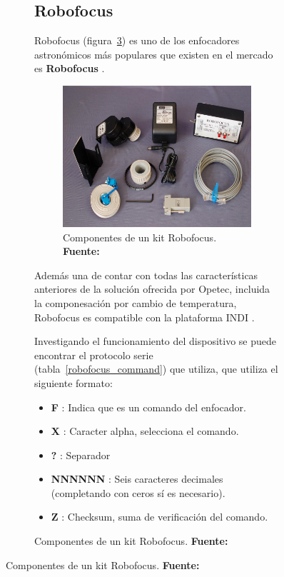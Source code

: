 \begin{itemize}
\begin{itemize}
\begin{figure}[h]
\begin{figure}[h]
\subsection{Robofocus}
\label{sec:robofocus}

Robofocus (figura~\ref{fig:robofocus2}) es uno de los enfocadores astronómicos más populares que existen en el mercado es \textbf{Robofocus} \cite{robofocus}.

\begin{figure}
\centering
\includegraphics[width=1\linewidth]{../images/robofocus2}
\caption[Kit Robofocus]{Componentes de un kit Robofocus. \textbf{Fuente:} \cite{robofocus}}
\label{fig:robofocus2}
\end{figure}

Además una de contar con todas las características anteriores de la solución ofrecida por Opetec, incluida la componesación por cambio de temperatura, Robofocus es compatible con la plataforma INDI \cite{robofocus_indi}. 

Investigando el funcionamiento del dispositivo se puede encontrar el protocolo serie (tabla~\ref{robofocus_command}) que utiliza, que utiliza el siguiente formato:

\begin{itemize}
	\item \textbf{F} : Indica que es un comando del enfocador.
	\item \textbf{X} : Caracter alpha, selecciona el comando.
	\item \textbf{?} : Separador
	\item \textbf{NNNNNN} : Seis caracteres decimales (completando con ceros sí es necesario).
	\item \textbf{Z} : Checksum, suma de verificación del comando. 
\end{itemize}






\end{figure}
\end{figure}
\end{itemize}
\end{itemize}
